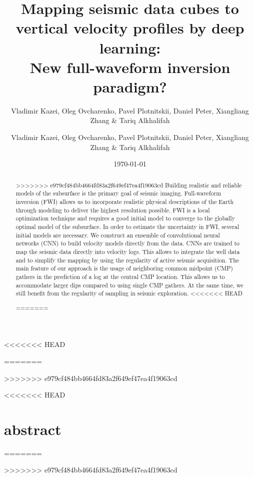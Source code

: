 \documentclass[paper,twocolomn]{geophysics}
\begin{document}
\title{Mapping seismic data cubes to vertical velocity profiles by deep learning: \\
	New full-waveform inversion paradigm?}

\renewcommand{\thefootnote}{\fnsymbol{footnote}} 

<<<<<<< HEAD
\author{Vladimir Kazei, Oleg Ovcharenko, Pavel Plotnitskii, Daniel Peter, Xiangliang Zhang \& Tariq Alkhalifah}
\address{
King Abdullah University of Science and Technology (KAUST), Thuwal, 23955-6900, Saudi Arabia \\
vladimir.kazei@kaust.edu.sa, oleg.ovcharenko@kaust.edu.sa, pavel.plotnitskii@kaust.edu.sa, \\
daniel.peter@kaust.edu.sa, xiangliang.zhang@kaust.edu.sa, tariq.alkhalifah@kaust.edu.sa}
=======
\author{Vladimir Kazei\footnotemark[1], Oleg Ovcharenko, Pavel Plotnitskii, Daniel Peter, Xiangliang Zhang \& Tariq Alkhalifah}
\address{
\footnotemark[1] KAUST, Saudi Arabia}
>>>>>>> e979cf484bb4664fd83a2f649ef47ea4f19063cd
\date{\today}


\maketitle
<<<<<<< HEAD

\newpage
\section{abstract}
=======

\begin{abstract}
>>>>>>> e979cf484bb4664fd83a2f649ef47ea4f19063cd
	Building realistic and reliable models of the subsurface is the primary goal of seismic imaging.
	Full-waveform inversion (FWI) allows us to incorporate realistic physical descriptions of the Earth through modeling to deliver the highest resolution possible.
	FWI is a local optimization technique and requires a good initial model to converge to the globally optimal model of the subsurface.
	In order to estimate the uncertainty in FWI, several initial models are necessary.
	We construct an ensemble of convolutional neural networks (CNN) to build velocity models directly from the data. 
	CNNs are trained to map the seismic data directly into velocity logs. This allows to integrate the well data and to simplify the mapping by using the regularity of active seismic acquisition. 
	The main feature of our approach is the usage of neighboring common midpoint (CMP) gathers in the prediction of a log at the central CMP location. This allows us to accommodate larger dips compared to using single CMP gathers. At the same time, we still benefit from the regularity of sampling in seismic exploration.  
<<<<<<< HEAD

=======
\end{abstract}
>>>>>>> e979cf484bb4664fd83a2f649ef47ea4f19063cd
\end{document}
